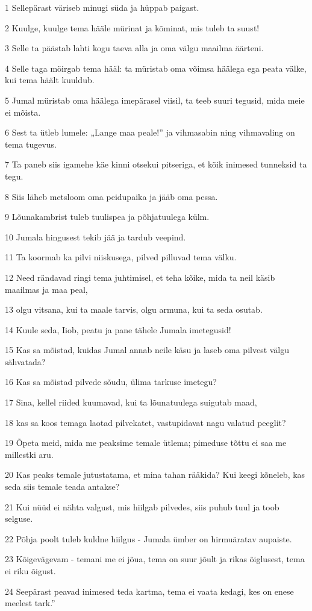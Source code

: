 \par 1 Sellepärast väriseb minugi süda ja hüppab paigast.
\par 2 Kuulge, kuulge tema hääle mürinat ja kõminat, mis tuleb ta suust!
\par 3 Selle ta päästab lahti kogu taeva alla ja oma välgu maailma äärteni.
\par 4 Selle taga möirgab tema hääl: ta müristab oma võimsa häälega ega peata välke, kui tema häält kuuldub.
\par 5 Jumal müristab oma häälega imepärasel viisil, ta teeb suuri tegusid, mida meie ei mõista.
\par 6 Sest ta ütleb lumele: „Lange maa peale!” ja vihmasabin ning vihmavaling on tema tugevus.
\par 7 Ta paneb siis igamehe käe kinni otsekui pitseriga, et kõik inimesed tunneksid ta tegu.
\par 8 Siis läheb metsloom oma peidupaika ja jääb oma pessa.
\par 9 Lõunakambrist tuleb tuulispea ja põhjatuulega külm.
\par 10 Jumala hingusest tekib jää ja tardub veepind.
\par 11 Ta koormab ka pilvi niiskusega, pilved pilluvad tema välku.
\par 12 Need rändavad ringi tema juhtimisel, et teha kõike, mida ta neil käsib maailmas ja maa peal,
\par 13 olgu vitsana, kui ta maale tarvis, olgu armuna, kui ta seda osutab.
\par 14 Kuule seda, Iiob, peatu ja pane tähele Jumala imetegusid!
\par 15 Kas sa mõistad, kuidas Jumal annab neile käsu ja laseb oma pilvest välgu sähvatada?
\par 16 Kas sa mõistad pilvede sõudu, ülima tarkuse imetegu?
\par 17 Sina, kellel riided kuumavad, kui ta lõunatuulega suigutab maad,
\par 18 kas sa koos temaga laotad pilvekatet, vastupidavat nagu valatud peeglit?
\par 19 Õpeta meid, mida me peaksime temale ütlema; pimeduse tõttu ei saa me millestki aru.
\par 20 Kas peaks temale jutustatama, et mina tahan rääkida? Kui keegi kõneleb, kas seda siis temale teada antakse?
\par 21 Kui nüüd ei nähta valgust, mis hiilgab pilvedes, siis puhub tuul ja toob selguse.
\par 22 Põhja poolt tuleb kuldne hiilgus - Jumala ümber on hirmuäratav aupaiste.
\par 23 Kõigevägevam - temani me ei jõua, tema on suur jõult ja rikas õiglusest, tema ei riku õigust.
\par 24 Seepärast peavad inimesed teda kartma, tema ei vaata kedagi, kes on enese meelest tark.”

